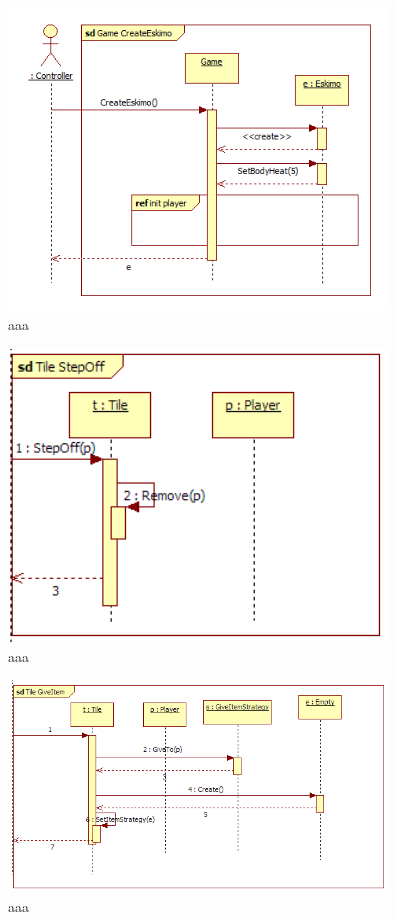 \begin{figure}[H]
	\begin{center}
		\includegraphics[width=10cm]{chapters/chapter03/seqdiag/Game_CreateEskimo.png}
		\caption{aaa}
		\label{bbb}
	\end{center}
\end{figure}
\begin{figure}[H]
	\begin{center}
		\includegraphics[width=10cm]{chapters/chapter03/seqdiag/Tile_StepOff.png}
		\caption{aaa}
		\label{bbb}
	\end{center}
\end{figure}
\begin{figure}[H]
	\begin{center}
		\includegraphics[width=10cm]{chapters/chapter03/seqdiag/Tile_GiveItem.png}
		\caption{aaa}
		\label{bbb}
	\end{center}
\end{figure}
